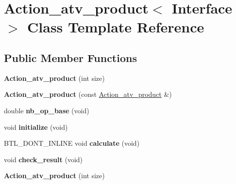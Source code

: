 \hypertarget{class_action__atv__product}{}\section{Action\+\_\+atv\+\_\+product$<$ Interface $>$ Class Template Reference}
\label{class_action__atv__product}
\subsection*{Public Member Functions}
\begin{DoxyCompactItemize}
\item 
\mbox{\label{class_action__atv__product_a85ef10323ff6263be8208603c2728a2b}} 
{\bfseries Action\+\_\+atv\+\_\+product} (int size)
\item 
\mbox{\label{class_action__atv__product_ac362871fd91d030962428a81c33d08be}} 
{\bfseries Action\+\_\+atv\+\_\+product} (const \hyperlink{class_action__atv__product}{Action\+\_\+atv\+\_\+product} \&)
\item 
\mbox{\label{class_action__atv__product_af365acf025e52e3b4a26e4caf76a1d76}} 
double {\bfseries nb\+\_\+op\+\_\+base} (void)
\item 
\mbox{\label{class_action__atv__product_a7fab0f64a841f7ed9a52a00bb13dad6f}} 
void {\bfseries initialize} (void)
\item 
\mbox{\label{class_action__atv__product_afaa8f5ae6eb038bfb9c4916bdcc64545}} 
B\+T\+L\+\_\+\+D\+O\+N\+T\+\_\+\+I\+N\+L\+I\+NE void {\bfseries calculate} (void)
\item 
\mbox{\label{class_action__atv__product_a4824a1b1840c6da5cbf5cfa606d388aa}} 
void {\bfseries check\+\_\+result} (void)
\item 
\mbox{\label{class_action__atv__product_a85ef10323ff6263be8208603c2728a2b}} 
{\bfseries Action\+\_\+atv\+\_\+product} (int size)
\item 
\mbox{\label{class_action__atv__product_ac362871fd91d030962428a81c33d08be}} 

\end{DoxyCompactItemize}
